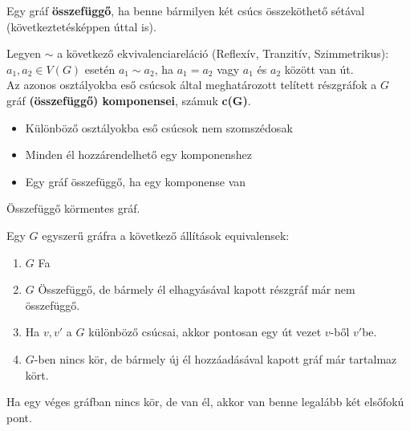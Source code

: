 \documentclass{beamer}
\newcommand{\mbigskip}{\vspace{1em}}
\begin{document}
\begin{frame}
\begin{tcolorbox}[title={Def.: Összeföggőség}]
Egy gráf \textbf{összefüggő}, ha benne bármilyen két csúcs összeköthető sétával (következtetésképpen úttal is).
\end{tcolorbox}
\begin{tcolorbox}[title={Def.: Komponensek}]
Legyen $\sim$ a következő ekvivalenciareláció (Reflexív, Tranzitív, Szimmetrikus):\\
\mbigskip
$a_1, a_2 \in V(G)$ esetén $a_1 \sim a_2$, ha $a_1 = a_2$ vagy $a_1$ és $a_2$ között van út.\\
\mbigskip
Az azonos osztályokba eső csúcsok által meghatározott telített részgráfok a $G$ gráf \textbf{(összefüggő) komponensei}, számuk \textbf{c(G)}.
\end{tcolorbox}
\begin{tcolorbox}[title={Ész}]
\begin{itemize}
\item Különböző osztályokba eső csúcsok nem szomszédosak
\item Minden él hozzárendelhető egy komponenshez
\item Egy gráf összefüggő, ha egy komponense van
\end{itemize}
\end{tcolorbox}
\end{frame}

\begin{frame}
\begin{tcolorbox}[title={Def.: Fa}]
Összefüggő körmentes gráf.
\end{tcolorbox}
\end{frame}

\begin{frame}
\begin{tcolorbox}[title={Tétel: Equivalens állítások fákra}]
Egy $G$ egyszerű gráfra a következő állítások equivalensek:
\begin{enumerate}
\item $G$ Fa
\item $G$ Összefüggő, de bármely él elhagyásával kapott részgráf már nem összefüggő.
\item Ha $v, v'$ a $G$ különböző csúcsai, akkor pontosan egy út vezet $v$-ből $v'$be.
\item $G$-ben nincs kör, de bármely új él hozzáadásával kapott gráf már tartalmaz kört.
\end{enumerate}
\end{tcolorbox}

\begin{tcolorbox}[title={Tétel: Elsőfokú pontok}]
Ha egy véges gráfban nincs kör, de van él, akkor van benne legalább két elsőfokú pont.
\end{tcolorbox}
\end{frame}
\end{document}
